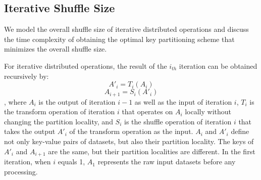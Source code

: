 \documentclass[10pt,journal,compsoc]{IEEEtran}
\begin{document}




\subsection{Iterative Shuffle Size}\label{section:model}
We model the overall shuffle size of iterative
distributed operations and discuss the time complexity of obtaining
the optimal key partitioning scheme that minimizes the overall shuffle
size.

For iterative distributed operations, the result of the $i_{th}$ iteration can be obtained recursively by:
\begin{equation}\label{eq:m}
A'_i=T_i(A_i)
\end{equation}
\begin{equation}\label{eq:r}
A_{i+1}=S_i(A'_i)
\end{equation}
, where $A_i$ is the output of iteration $i-1$ as well as the input of iteration $i$, 
$T_i$ is the transform operation of iteration $i$ that operates on $A_i$ locally without changing the partition locality, 
and $S_i$ is the shuffle operation of iteration $i$ that takes the output $A'_i$ of the transform operation as the input.  
$A_i$ and $A'_i$ define not only key-value pairs of datasets, but also their partition locality. 
The keys of $A'_i$ and $A_{i+1}$ are the same, but their partition localities are different. 
In the first iteration, when $i$ equals 1, 
$A_1$ represents the raw input datasets before any processing.  
\end{document}
